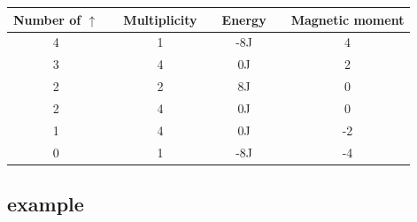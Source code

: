 \begin{center}
\label{tab:states-2x2-summary}
\begin{tabularx}{\textwidth}{c X c X c X c}
    \hline 
    \hline 
        Number of $\uparrow$ && Multiplicity && Energy && Magnetic moment \\ 
    \hline
        4   &&      1      &&      -8J     &&       4       \\  
        3   &&      4      &&      0J      &&       2       \\
        2   &&      2      &&      8J      &&       0       \\
        2   &&      4      &&      0J      &&       0       \\
        1   &&      4      &&      0J      &&       -2      \\
        0   &&      1      &&      -8J     &&       -4      \\
    \hline
\end{tabularx}
\end{center}

\pagebreak
\subsection{example}

